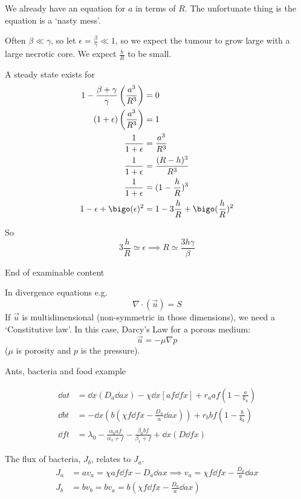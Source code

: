 \documentclass{X:/Documents/Coding/Latex/myassignment}
\begin{document}
We already have an equation for $a$ in terms of $R$. The unfortunate thing is the equation is a `nasty mess'.

Often $\beta \ll \gamma$, so let $\epsilon = \frac \beta \gamma \ll 1$, so we expect the tumour to grow large with a large necrotic core. We expect $\frac{h}{R}$ to be small.

A steady state exists for
\begin{align*}
	1 - \frac{\beta + \gamma}{\gamma} \left(\frac{a^3}{R^3}\right) &= 0\\
	(1 + \epsilon)\left(\frac{a^3}{R^3}\right) &= 1\\
	\frac{1}{1+\epsilon} &= \frac{a^3}{R^3}\\
	\frac{1}{1+\epsilon} &= \frac{(R-h)^3}{R^3}\\
	\frac{1}{1+\epsilon} &= (1-\frac{h}{R})^3\\
	1 - \epsilon + \bigo(\epsilon)^2 &= 1 - 3\frac{h}{R} + \bigo(\frac{h}{R})^2
\end{align*}

So 
\[3\frac{h}{R} \simeq \epsilon \implies R \simeq \frac{3h \gamma}{\beta}\]



End of examinable content


In divergence equations e.g.
\[\nabla \cdot (\vec u) = S\]
If $\vec u$ is multidimensional (non-symmetric in those dimensions), we need a `Constitutive law'. In this case, Darcy's Law for a porous medium:
\[\vec u = - \mu \nabla p\]
($\mu$ is porosity and $p$ is the pressure).




Ants, bacteria and food example

\begin{align*}
	\dd at &= \dd{}x (D_a \dd ax) -  \chi \dd{}x \left[ af\dd fx \right] + r_a af\left(1 - \frac{a}{k_a}\right)\\
	\dd bt &= -\dd{}x \left(b \left(\chi f \dd fx - \frac{D_a}{a} \dd ax\right)\right) + r_b b f \left(1 - \frac{b}{k_b}\right)\\
	\dd ft &= \lambda_0 - \frac{\alpha_0 a f}{\alpha_1 + f} - \frac{\beta_0 b f}{\beta_1 + f} + \dd{}x\left(D \dd fx\right)
\end{align*}

The flux of bacteria, $J_b$, relates to $J_a$.
\begin{align*}
	J_a &= a v_a = \chi a f \dd fx - D_a \dd ax \implies v_a = \chi f \dd fx - \frac{D_a}{a} \dd ax\\
	J_b &= bv_b = b v_a =  b \left(\chi f \dd fx - \frac{D_a}{a} \dd ax\right)
\end{align*}
\end{document}

